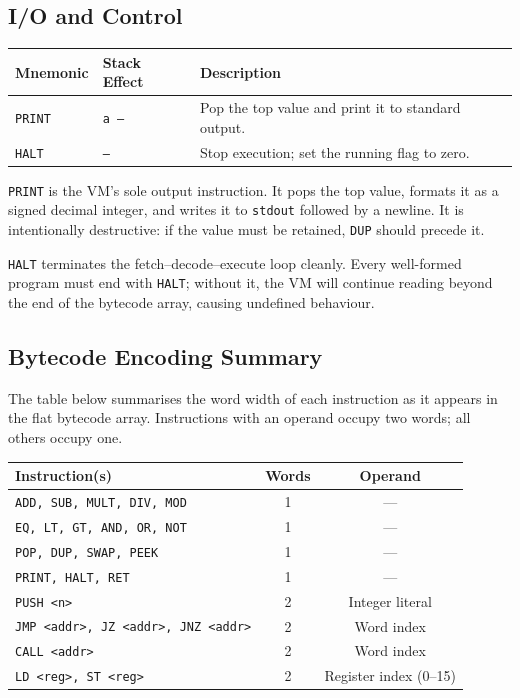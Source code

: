 \subsection{I/O and Control}

\begin{center}
\begin{tabular}{lll}
\toprule
\textbf{Mnemonic} & \textbf{Stack Effect} & \textbf{Description} \\
\midrule
\texttt{PRINT} & \texttt{a --} & Pop the top value and print it to standard output. \\
\texttt{HALT}  & \texttt{--}   & Stop execution; set the running flag to zero. \\
\bottomrule
\end{tabular}
\end{center}

\texttt{PRINT} is the VM's sole output instruction. It pops the top value, formats it as a signed decimal integer, and writes it to \texttt{stdout} followed by a newline. It is intentionally destructive: if the value must be retained, \texttt{DUP} should precede it.

\texttt{HALT} terminates the fetch–decode–execute loop cleanly. Every well-formed program must end with \texttt{HALT}; without it, the VM will continue reading beyond the end of the bytecode array, causing undefined behaviour.

\subsection{Bytecode Encoding Summary}

The table below summarises the word width of each instruction as it appears in the flat bytecode array. Instructions with an operand occupy two words; all others occupy one.

\begin{center}
\begin{tabular}{lcc}
\toprule
\textbf{Instruction(s)} & \textbf{Words} & \textbf{Operand} \\
\midrule
\texttt{ADD, SUB, MULT, DIV, MOD}       & 1 & — \\
\texttt{EQ, LT, GT, AND, OR, NOT}       & 1 & — \\
\texttt{POP, DUP, SWAP, PEEK}           & 1 & — \\
\texttt{PRINT, HALT, RET}               & 1 & — \\
\texttt{PUSH <n>}                       & 2 & Integer literal \\
\texttt{JMP <addr>, JZ <addr>, JNZ <addr>} & 2 & Word index \\
\texttt{CALL <addr>}                    & 2 & Word index \\
\texttt{LD <reg>, ST <reg>}             & 2 & Register index (0--15) \\
\bottomrule
\end{tabular}
\end{center}

